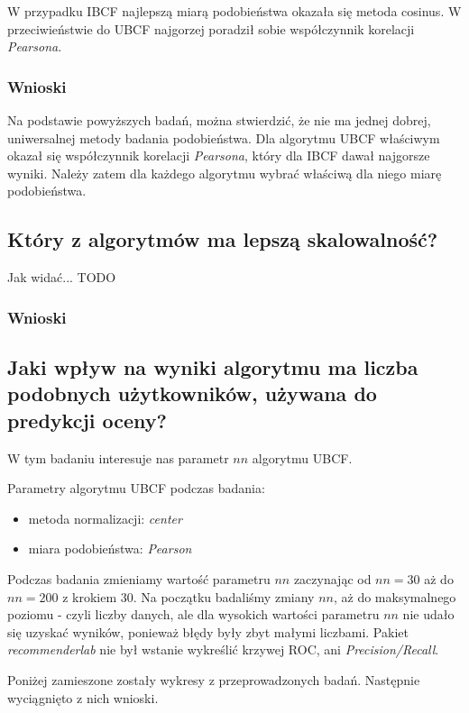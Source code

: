 \documentclass[12pt, a4paper]{article}
\begin{document}
W przypadku IBCF najlepszą miarą podobieństwa okazała się metoda cosinus. W przeciwieństwie do UBCF najgorzej poradził sobie współczynnik korelacji \emph{Pearsona}.



\subsubsection{Wnioski}
Na podstawie powyższych badań, można stwierdzić, że nie ma jednej dobrej, uniwersalnej metody badania podobieństwa. Dla algorytmu UBCF właściwym okazał się współczynnik korelacji \emph{Pearsona}, który dla IBCF dawał najgorsze wyniki. Należy zatem dla każdego algorytmu wybrać właściwą dla niego miarę podobieństwa.

\subsection{Który z algorytmów ma lepszą skalowalność?}



Jak widać... TODO

\subsubsection{Wnioski}

\subsection{Jaki wpływ na wyniki algorytmu ma liczba podobnych użytkowników, używana do predykcji oceny?}
W tym badaniu interesuje nas parametr $nn$ algorytmu UBCF. 

Parametry algorytmu UBCF podczas badania:
\begin{itemize}
\item metoda normalizacji: \emph{center}
\item miara podobieństwa: \emph{Pearson}
\end{itemize}

Podczas badania zmieniamy wartość parametru $nn$ zaczynając od $nn=30$ aż do $nn=200$ z krokiem $30$. Na początku badaliśmy zmiany $nn$, aż do maksymalnego poziomu - czyli liczby danych, ale dla wysokich wartości parametru $nn$ nie udało się uzyskać wyników, ponieważ błędy były zbyt małymi liczbami. Pakiet \emph{recommenderlab} nie był wstanie wykreślić krzywej ROC, ani \emph{Precision/Recall}.

Poniżej zamieszone zostały wykresy z przeprowadzonych badań. Następnie wyciągnięto z nich wnioski.
\end{document}
